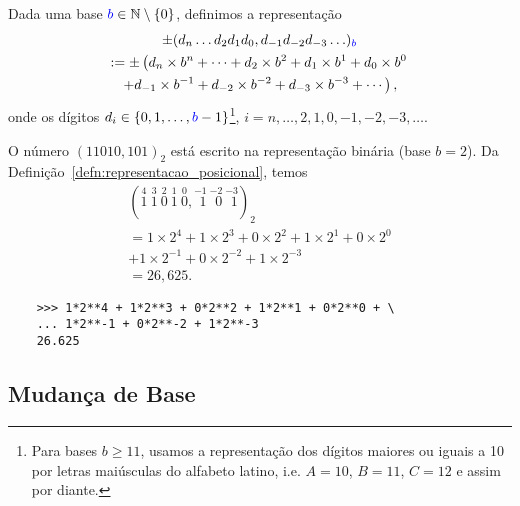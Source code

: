 \begin{defn}\label{defn:representacao_posicional}
  Dada uma base ${\color{blue}b}\in\mathbb{N}\setminus \{0\}$, definimos a representação
  \begin{gather}
    \pm (d_n\ldots d_2d_1d_0,d_{-1}d_{-2}d_{-3}\ldots)_{\color{blue}b} \\
    := \pm \left(d_n\times b^n + \cdots + d_2\times b^2 + d_1\times b^1 + d_0\times b^0\right. \\
      \left. + d_{-1}\times b^{-1} + d_{-2}\times b^{-2} + d_{-3}\times b^{-3} + \cdots\right),
  \end{gather}
onde os dígitos $d_i\in\{0, 1, \dotsc, {\color{blue}b}-1\}$\footnote{Para bases $b\geq 11$, usamos a representação dos dígitos maiores ou iguais a 10 por letras maiúsculas do alfabeto latino, i.e. $A=10$, $B=11$, $C=12$ e assim por diante.}, $i=n, \dotsc, 2, 1, 0, -1, -2, -3, \ldots$.
\end{defn}

\begin{ex}\label{ex:base_binaria}
  O número $(11010,101)_2$ está escrito na representação binária (base $b=2$). Da Definição~\ref{defn:representacao_posicional}, temos
  \begin{gather}
    (\stackrel{4}{1}~\stackrel{3}{1}~\stackrel{2}{0}~\stackrel{1}{1}~\stackrel{0}{0},\stackrel{-1}{~\,1}~\stackrel{-2}{~\,0}~\stackrel{-3}{~\,1})_2\\
    = 1\times 2^4 + 1\times 2^3 + 0\times 2^2 + 1\times 2^1 + 0\times 2^0\\
    + 1\times 2^{-1} + 0\times 2^{-2} + 1\times 2^{-3}\\
    = 26,625.
  \end{gather}

  \ifispython
  \begin{lstlisting}
    >>> 1*2**4 + 1*2**3 + 0*2**2 + 1*2**1 + 0*2**0 + \
    ... 1*2**-1 + 0*2**-2 + 1*2**-3
    26.625
  \end{lstlisting}
  \fi
\end{ex}

\subsection{Mudança de Base}

